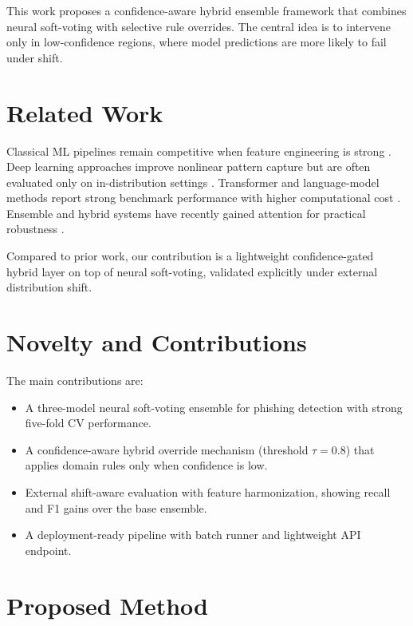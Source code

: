 ﻿\documentclass[conference]{IEEEtran}
\begin{document}
This work proposes a confidence-aware hybrid ensemble framework that combines neural soft-voting with selective rule overrides. The central idea is to intervene only in low-confidence regions, where model predictions are more likely to fail under shift.

\section{Related Work}
Classical ML pipelines remain competitive when feature engineering is strong \cite{reyesdorta2024malicious,prasad2023phiusiil,nagy2023sequentialparallel,kustiawan2025featureeng}. Deep learning approaches improve nonlinear pattern capture but are often evaluated only on in-distribution settings \cite{zaimi2024smotetomek,barik2025optimization,bourigue2025cluster}. Transformer and language-model methods report strong benchmark performance with higher computational cost \cite{su2023bert,he2024tinybert,kibriya2025llm,huynh2025semantic}. Ensemble and hybrid systems have recently gained attention for practical robustness \cite{zhou2025enlem,zhou2025logicconstraint,dandotiya2026realtime,gobinath2026optimized}. 

Compared to prior work, our contribution is a lightweight confidence-gated hybrid layer on top of neural soft-voting, validated explicitly under external distribution shift.

\section{Novelty and Contributions}
The main contributions are:
\begin{itemize}
    \item A three-model neural soft-voting ensemble for phishing detection with strong five-fold CV performance.
    \item A confidence-aware hybrid override mechanism (threshold $\tau=0.8$) that applies domain rules only when confidence is low.
    \item External shift-aware evaluation with feature harmonization, showing recall and F1 gains over the base ensemble.
    \item A deployment-ready pipeline with batch runner and lightweight API endpoint.
\end{itemize}

\section{Proposed Method}
\end{document}
